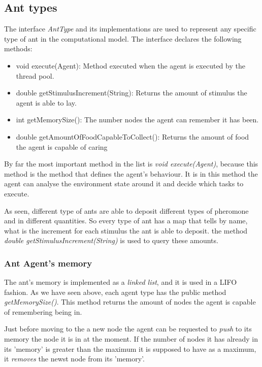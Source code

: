 \subsection{Ant types}

The interface \emph{AntType} and its implementations are used to represent any specific type of ant in the computational model. The interface declares the following methods:

\begin{itemize}

  \item void execute(Agent): Method executed when the agent is executed by the thread pool.
  \item double getStimulusIncrement(String): Returns the amount of stimulus the agent is able to lay.
  \item int getMemorySize(): The number nodes the agent can remember it has been.
  \item double getAmountOfFoodCapableToCollect(): Returns the amount of food the agent is capable of caring 

\end{itemize}


By far the most important method in the list is \emph{void execute(Agent)}, because this method is the method that defines the agent's behaviour. It is in this method the agent can analyse the environment state around it and decide which tasks to execute.

As seen, different type of ants are able to deposit different types of pheromone and in different quantities. So every type of ant has a map that tells by name, what is the increment for each stimulus the ant is able to deposit. the method \emph{double getStimulusIncrement(String)} is used to query these amounts.

\subsubsection{Ant Agent's memory}
\label{sec:ant-memory}

The ant's memory is implemented as a \emph{linked list}, and it is used in a \ac{LIFO} fashion. As we have seen above, each agent type has the public method \emph{getMemorySize()}. This method returns the amount of nodes the agent is capable of remembering being in.

Just before moving to the a new node the agent can be requested to \emph{push} to its memory the node it is in at the moment. If the number of nodes it has already in its 'memory' is greater than the maximum it is supposed to have as a maximum, it \emph{removes} the newst node from its 'memory'.

